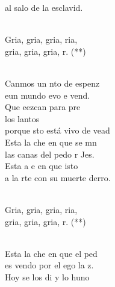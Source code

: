 \documentclass[12pt]{article}
\begin{document}
\begin{multicols*}{2}
\begin{cancion}
	al salo de la esclavid. \\\jump\\
	\begin{chorus}%
	Gria, gria, gria, ria,\\
	gria, gria, gria, r. (**)\\
	\end{chorus}%
	\jump\\
	Canmos un nto de espenz\\
	eun mundo evo e vend.  \\
	Que eezcan para pre \\
	los lantos\\
	porque sto está vivo de vead\\
\jump
	Esta  la che en que se mn\\
	las canas del pedo r Jes.\\
	Esta a e en que isto\\
	a la rte con su muerte derro. \\\jump\\
	\begin{chorus}%
	Gria, gria, gria, ria,\\
	gria, gria, gria, r. (**)\\
	\end{chorus}%
	\jump\\
	Esta  la che en que el ped\\
	es vendo por el ego  la z.\\
	Hoy se  los di y lo huno\\

\end{cancion}
\end{multicols*}
\end{document}
